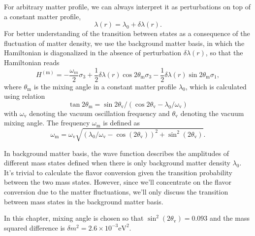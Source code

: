 For arbitrary matter profile, we can always interpret it as perturbations on top of a constant matter profile,
\begin{equation}
    \lambda(r) = \lambda_0 + \delta \lambda(r).
    \label{eq-general-matter-profile}
\end{equation}
For better understanding of the transition between states as a consequence of the fluctuation of matter density, we use the background matter basis, in which the Hamiltonian is diagonalized in the absence of perturbation $\delta\lambda(r)$, so that the Hamiltonian reads
\begin{equation}
    H^{(\mathrm{m})} = -\frac{\omega_m}{2} \sigma_3 + \frac{1}{2} \delta\lambda(r) \cos 2\theta_{\mathrm m} \sigma_3
     - \frac{1}{2} \delta\lambda(r) \sin 2\theta_{\mathrm m} \sigma_1,
    \label{eq-hamiltonian-bg-matter-basis-general}
\end{equation}
where $\theta_{\mathrm m}$ is the mixing angle in a constant matter profile $\lambda_0$, which is calculated using relation
\begin{equation*}
\tan 2\theta_{\mathrm{m}}=\sin 2\theta_{\mathrm v}/\left( \cos 2\theta_{\mathrm v} - \lambda_0/\omega_{\mathrm v} \right)
\end{equation*}
with $\omega_{\mathrm v}$ denoting the vacuum oscillation frequency and $\theta_{\mathrm v}$ denoting the vacuum mixing angle. The frequency $\omega_{\mathrm m}$ is defined as
\begin{equation}
\omega_{\mathrm{m}} = \omega_{\mathrm{v}} \sqrt{ ( \lambda_0/\omega_{\mathrm{v}} - \cos (2\theta_{\mathrm{v}}) )^2 + \sin^2(2\theta_{\mathrm{v}}) }.
\end{equation}

In background matter basis, the wave function describes the amplitudes of different mass states defined when there is only background matter density $\lambda_0$. It's trivial to calculate the flavor conversion given the transition probability between the two mass states. However, since we'll concentrate on the flavor conversion due to the matter fluctuations, we'll only discuss the transition between mass states in the background matter basis.

In this chapter, mixing angle is chosen so that $\sin^2(2\theta_{\mathrm v}) = 0.093$ and the mass squared difference is $\delta m^2 = 2.6\times 10^{-3}\mathrm{eV}^2$.







